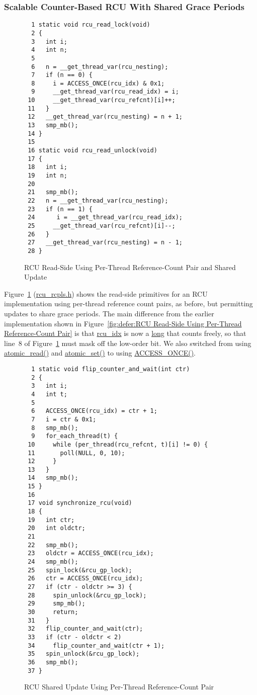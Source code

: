 \subsubsection{Scalable Counter-Based RCU With Shared Grace Periods}
\label{defer:Scalable Counter-Based RCU With Shared Grace Periods}

\begin{figure}[tbp]
{ \scriptsize
\begin{verbatim}
  1 static void rcu_read_lock(void)
  2 {
  3   int i;
  4   int n;
  5
  6   n = __get_thread_var(rcu_nesting);
  7   if (n == 0) {
  8     i = ACCESS_ONCE(rcu_idx) & 0x1;
  9     __get_thread_var(rcu_read_idx) = i;
 10     __get_thread_var(rcu_refcnt)[i]++;
 11   }
 12   __get_thread_var(rcu_nesting) = n + 1;
 13   smp_mb();
 14 }
 15
 16 static void rcu_read_unlock(void)
 17 {
 18   int i;
 19   int n;
 20
 21   smp_mb();
 22   n = __get_thread_var(rcu_nesting);
 23   if (n == 1) {
 24      i = __get_thread_var(rcu_read_idx);
 25     __get_thread_var(rcu_refcnt)[i]--;
 26   }
 27   __get_thread_var(rcu_nesting) = n - 1;
 28 }
\end{verbatim}
}
\caption{RCU Read-Side Using Per-Thread Reference-Count Pair and Shared Update}
\label{fig:defer:RCU Read-Side Using Per-Thread Reference-Count Pair and Shared Update}
\end{figure}

Figure~\ref{fig:defer:RCU Read-Side Using Per-Thread Reference-Count Pair and Shared Update}
(\url{rcu_rcpls.h})
shows the read-side primitives for an RCU implementation using per-thread
reference count pairs, as before, but permitting updates to share
grace periods.
The main difference from the earlier implementation shown in
Figure~\ref{fig:defer:RCU Read-Side Using Per-Thread Reference-Count Pair}
is that \url{rcu_idx} is now a \url{long} that counts freely,
so that line~8 of
Figure~\ref{fig:defer:RCU Read-Side Using Per-Thread Reference-Count Pair and Shared Update}
must mask off the low-order bit.
We also switched from using \url{atomic_read()} and \url{atomic_set()}
to using \url{ACCESS_ONCE()}.

\begin{figure}[tbp]
{ \scriptsize
\begin{verbatim}
  1 static void flip_counter_and_wait(int ctr)
  2 {
  3   int i;
  4   int t;
  5
  6   ACCESS_ONCE(rcu_idx) = ctr + 1;
  7   i = ctr & 0x1;
  8   smp_mb();
  9   for_each_thread(t) {
 10     while (per_thread(rcu_refcnt, t)[i] != 0) {
 11       poll(NULL, 0, 10);
 12     }
 13   }
 14   smp_mb();
 15 }
 16
 17 void synchronize_rcu(void)
 18 {
 19   int ctr;
 20   int oldctr;
 21
 22   smp_mb();
 23   oldctr = ACCESS_ONCE(rcu_idx);
 24   smp_mb();
 25   spin_lock(&rcu_gp_lock);
 26   ctr = ACCESS_ONCE(rcu_idx);
 27   if (ctr - oldctr >= 3) {
 28     spin_unlock(&rcu_gp_lock);
 29     smp_mb();
 30     return;
 31   }
 32   flip_counter_and_wait(ctr);
 33   if (ctr - oldctr < 2)
 34     flip_counter_and_wait(ctr + 1);
 35   spin_unlock(&rcu_gp_lock);
 36   smp_mb();
 37 }
\end{verbatim}
}
\caption{RCU Shared Update Using Per-Thread Reference-Count Pair}
\label{fig:defer:RCU Shared Update Using Per-Thread Reference-Count Pair}
\end{figure}


